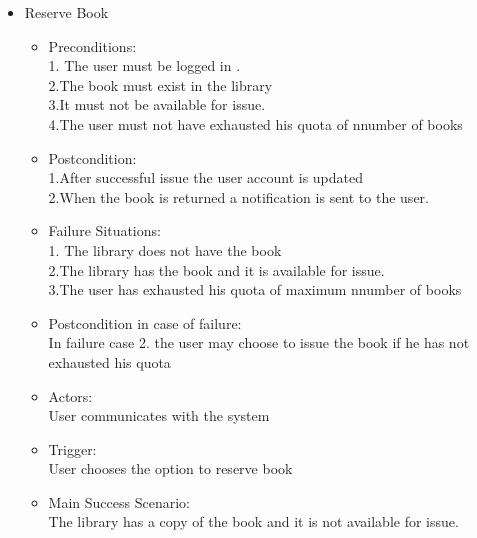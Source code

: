 \documentclass[a4paper]{article}
\begin{document}
\begin{enumerate}
\begin{itemize}
 \item Reserve Book\\
	\begin{itemize}
	\item  Preconditions:\\
	1. The user must be logged in .\\
	2.The book must exist in the library\\ 
	3.It must not  be available for issue.\\
	4.The user must not have exhausted his quota of nnumber of books\\
 \item Postcondition:\\
 1.After successful issue the user account is updated \\
 2.When the book is returned a notification is sent to the user.\\
 \item Failure Situations:\\
 1. The library does not have  the book \\
 2.The library has the book and it is  available for issue.\\
 3.The user has exhausted his quota of maximum nnumber of books\\
 \item Postcondition in case of failure:\\In failure case 2. the user may choose to issue the book if he has not exhausted his quota\\
 \item Actors:\\ User communicates with the system\\
 \item Trigger:\\ User chooses the option to reserve book\\
 \item Main Success Scenario:\\ The library has a copy of the book and it is not available for issue.\\
 
	\end{itemize}
 

\end{itemize}
\end{enumerate}
\end{document}
